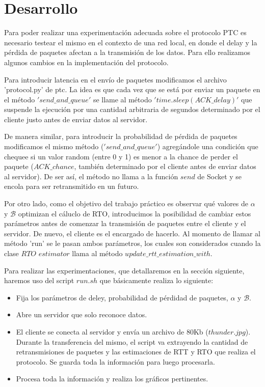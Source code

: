 \section{Desarrollo}
Para poder realizar una experimentaci\'on adecuada sobre el protocolo PTC es necesario testear el mismo en el contexto de una red local, en donde el delay y la p\'erdida de paquetes afectan a la transmisi\'on de los datos. Para ello realizamos algunos cambios en la implementaci\'on del protocolo.

Para introducir latencia en el env\'io de paquetes modificamos el archivo 'protocol.py' de ptc. La idea es que cada vez que se est\'a por enviar un paquete en el m\'etodo $'send\_and\_queue'$ se llame al m\'etodo $'time.sleep(ACK\_delay)'$ que suspende la ejecuci\'on por una cantidad arbitraria de segundos determinado por el cliente justo antes de enviar datos al servidor.

De manera similar, para introducir la probabilidad de p\'erdida de paquetes modificamos el mismo m\'etodo ($'send\_and\_queue'$) agreg\'andole una condici\'on que chequee si un valor random (entre 0 y 1) es menor a la chance de perder el paquete ($ACK\_chance$, tambi\'en determinado por el cliente antes de enviar datos al servidor). De ser as\'i, el m\'etodo no llama a la funci\'on $send$ de Socket y se encola para ser retransmitido en un futuro.

Por otro lado, como el objetivo del trabajo pr\'actico es observar qu\'e valores de $\alpha$ y $\mathcal{B}$ optimizan el c\'aluclo de RTO, introducimos la posibilidad de cambiar estos par\'ametros antes de comenzar la transmisi\'on de paquetes entre el cliente y el servidor. De nuevo, el cliente es el encargado de hacerlo. Al momento de llamar al m\'etodo 'run' se le pasan ambos par\'ametros, los cuales son considerados cuando la clase $RTO$ $estimator$ llama al m\'etodo $update\_rtt\_estimation\_with$.

Para realizar las experimentaciones, que detallaremos en la secci\'on siguiente, haremos uso del script $run.sh$
que b\'asicamente realiza lo siguiente:
\begin{itemize}
	\item Fija los par\'ametros de deley, probabilidad de p\'erdidad de paquetes, $\alpha$ y $\mathcal{B}$.
	\item Abre un servidor que solo reconoce datos.
	\item El cliente se conecta al servidor y env\'ia un archivo de 80Kb ($thunder.jpg$). Durante la transferencia del mismo, el script va extrayendo la cantidad de retransmisiones de paquetes y las estimaciones de RTT y RTO que realiza el protocolo. Se guarda toda la informaci\'on para luego procesarla.
	\item Procesa toda la informaci\'on y realiza los gr\'aficos pertinentes.
\end{itemize}